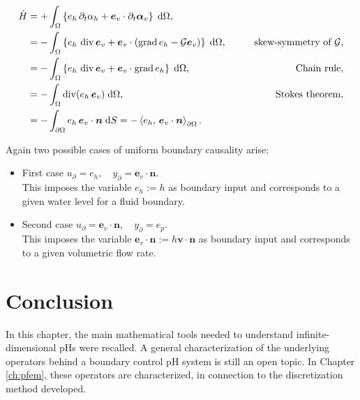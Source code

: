 \begin{equation}\label{eq:enrate_shwater}
\begin{aligned}
\dot{H} &= +\int_{\Omega} \left\{ e_h \, \partial_t \alpha_h + \bm{e}_v \cdot \partial_t \bm{\alpha}_v \right\} \d\Omega, \\
&= -\int_{\Omega} \left\{ e_h \, \div \bm{e}_v + \bm{e}_v \cdot (\grad e_h - \mathcal{G} \bm{e}_v) \right\} \d\Omega, \qquad &\text{skew-symmetry of }\mathcal{G}, \\
&= -\int_{\Omega} \left\{e_h \, \div \bm{e}_v + \bm{e}_v \cdot \grad e_h \right\}\d\Omega, \qquad &\text{Chain rule},  \\
&= -\int_{\Omega} \div(e_h \, \bm{e}_v) \d\Omega, \qquad &\text{Stokes theorem}, \\
&= -\int_{\partial \Omega} e_h \, \bm{e}_v\cdot\bm{n} \d{S} = -\inner[\partial\Omega]{e_h}{\bm{e}_v \cdot\bm{n}}.
\end{aligned}
\end{equation}

Again two possible cases of uniform boundary causality arise:
\begin{itemize}
	\item {First case} ${u}_\partial = e_h, \quad {y}_\partial = \bm{e}_v \cdot\bm{n}$. \\
	This imposes the variable $e_h:= h$ as boundary input and corresponds to a given water level for a fluid boundary.
	
	\item {Second case} ${u}_\partial = \bm{e}_v \cdot\bm{n}, \quad {y}_\partial = e_p$. \\
	This imposes the variable $\bm{e}_v \cdot\bm{n}:= h \bm{v} \cdot \bm{n}$ as boundary input and corresponds to a given volumetric flow rate.
\end{itemize} 

\section{Conclusion}
In this chapter, the main mathematical tools needed to understand infinite-dimensional pHs were recalled. A general characterization of the underlying operators behind a boundary control pH system is still an open topic.  In Chapter \ref{ch:pfem}, these operators are characterized, in connection to the discretization method developed.
